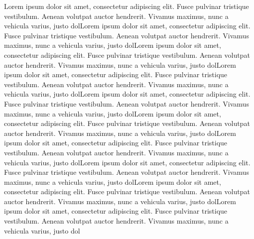 
Lorem ipsum dolor sit amet, consectetur adipiscing elit. Fusce pulvinar tristique vestibulum. Aenean volutpat auctor hendrerit. Vivamus maximus, nunc a vehicula varius, justo dolLorem ipsum dolor sit amet, consectetur adipiscing elit. Fusce pulvinar tristique vestibulum. Aenean volutpat auctor hendrerit. Vivamus maximus, nunc a vehicula varius, justo dolLorem ipsum dolor sit amet, consectetur adipiscing elit. Fusce pulvinar tristique vestibulum. Aenean volutpat auctor hendrerit. Vivamus maximus, nunc a vehicula varius, justo dolLorem ipsum dolor sit amet, consectetur adipiscing elit. Fusce pulvinar tristique vestibulum. Aenean volutpat auctor hendrerit. Vivamus maximus, nunc a vehicula varius, justo dolLorem ipsum dolor sit amet, consectetur adipiscing elit. Fusce pulvinar tristique vestibulum. Aenean volutpat auctor hendrerit. Vivamus maximus, nunc a vehicula varius, justo dolLorem ipsum dolor sit amet, consectetur adipiscing elit. Fusce pulvinar tristique vestibulum. Aenean volutpat auctor hendrerit. Vivamus maximus, nunc a vehicula varius, justo dolLorem ipsum dolor sit amet, consectetur adipiscing elit. Fusce pulvinar tristique vestibulum. Aenean volutpat auctor hendrerit. Vivamus maximus, nunc a vehicula varius, justo dolLorem ipsum dolor sit amet, consectetur adipiscing elit. Fusce pulvinar tristique vestibulum. Aenean volutpat auctor hendrerit. Vivamus maximus, nunc a vehicula varius, justo dolLorem ipsum dolor sit amet, consectetur adipiscing elit. Fusce pulvinar tristique vestibulum. Aenean volutpat auctor hendrerit. Vivamus maximus, nunc a vehicula varius, justo dolLorem ipsum dolor sit amet, consectetur adipiscing elit. Fusce pulvinar tristique vestibulum. Aenean volutpat auctor hendrerit. Vivamus maximus, nunc a vehicula varius, justo dol